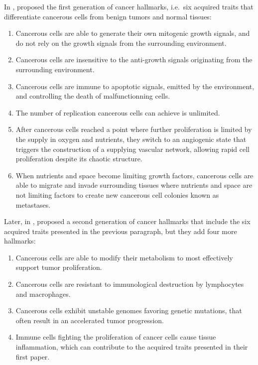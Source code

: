 In \citeyear{Hanahan:2000hx}, \citet{Hanahan:2000hx} proposed the first generation of cancer hallmarks, i.e.~six acquired traits that differentiate cancerous cells from benign tumors and normal tissues:
\begin{enumerate}
    \item Cancerous cells are able to generate their own mitogenic growth signals, and do not rely on the growth signals from the surrounding environment.
    \item Cancerous cells are insensitive to the anti-growth signals originating from the surrounding environment.
    \item Cancerous cells are immune to apoptotic signals, emitted by the environment, and controlling the death of malfunctionning cells.
    \item The number of replication cancerous cells can achieve is unlimited.
    \item After cancerous cells reached a point where further proliferation is limited by the supply in oxygen and nutrients, they switch to an angiogenic state that triggers the construction of a supplying vascular network, allowing rapid cell proliferation despite its chaotic structure.
    \item When nutrients and space become limiting growth factors, cancerous cells are able to migrate and invade surrounding tissues where nutrients and space are not limiting factors to create new cancerous cell colonies known as metastases.
\end{enumerate}

Later, in \citeyear{Hanahan:2011gu}, \citet{Hanahan:2011gu} proposed a second generation of cancer hallmarks that include the six acquired traits presented in the previous paragraph, but they add four more hallmarks:
\begin{enumerate}
    \item Cancerous cells are able to modify their metabolism to most effectively support tumor proliferation.
    \item Cancerous cells are resistant to immunological destruction by lymphocytes and macrophages.
    \item Cancerous cells exhibit unstable genomes favoring genetic mutations, that often result in an accelerated tumor progression.
    \item Immune cells fighting the proliferation of cancer cells cause tissue inflammation, which can contribute to the acquired traits presented in their first paper.
\end{enumerate}


